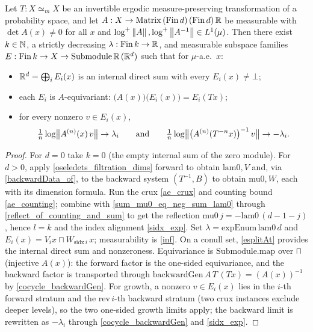 \begin{theorem}\label{oseledets_splitting}
  \leanok
  Let \(T : X \simeq_m X\) be an invertible ergodic measure-preserving transformation of a probability space, and let \(A : X \to \mathrm{Matrix}\,(\mathrm{Fin}\,d)\,(\mathrm{Fin}\,d)\,\mathbb{R}\) be measurable with \(\det A(x) \neq 0\) for all \(x\) and \(\log^+\left\lVert A \right\rVert, \log^+\left\lVert A^{-1} \right\rVert \in L^1(\mu)\). Then there exist \(k \in \mathbb{N}\), a strictly decreasing \(\lambda : \mathrm{Fin}\,k \to \mathbb{R}\), and measurable subspace families \(E : \mathrm{Fin}\,k \to X \to \mathrm{Submodule}\,\mathbb{R}\,(\mathbb{R}^d)\) such that for \(\mu\)-a.e.\ \(x\):
  \begin{itemize}
    \item \(\mathbb{R}^d = \bigoplus_{i} E_i(x)\) is an internal direct sum with every \(E_i(x) \neq \bot\);
    \item each \(E_i\) is \(A\)-equivariant: \(\bigl(A(x)\bigr)\bigl(E_i(x)\bigr) = E_i(Tx)\);
    \item for every nonzero \(v \in E_i(x)\),
    \[
      \tfrac{1}{n}\log\bigl\lVert A^{(n)}(x)\,v \bigr\rVert \to \lambda_i \qquad\text{and}\qquad \tfrac{1}{n}\log\bigl\lVert \bigl(A^{(n)}(T^{-n}x)\bigr)^{-1}\,v \bigr\rVert \to -\lambda_i.
    \]
  \end{itemize}
\end{theorem}
\begin{proof}\leanok
  For \(d = 0\) take \(k = 0\) (the empty internal sum of the zero module). For \(d > 0\), apply \cref{oseledets_filtration_dims} forward to obtain \(\mathrm{lam0}, V\) and, via \cref{backwardData_of}, to the backward system \((T^{-1}, B)\) to obtain \(\mathrm{mu0}, W\), each with its dimension formula. Run the crux \cref{ae_crux} and counting bound \cref{ae_counting}; combine with \cref{sum_mu0_eq_neg_sum_lam0} through \cref{reflect_of_counting_and_sum} to get the reflection \(\mathrm{mu0}\,j = -\mathrm{lam0}\,(d-1-j)\), hence \(l = k\) and the index alignment \cref{sidx_exp}. Set \(\lambda = \mathrm{expEnum}\,\mathrm{lam0}\,d\) and \(E_i(x) = V_i x \sqcap W_{\mathrm{sidx}\,i}\,x\); measurability is \cref{inf}. On a conull set, \cref{esplitAt} provides the internal direct sum and nonzeroness. Equivariance is \(\mathrm{Submodule.map}\) over \(\sqcap\) (injective \(A(x)\)): the forward factor is the one-sided equivariance, and the backward factor is transported through \(\mathrm{backwardGen}\,A\,T\,(Tx) = (A(x))^{-1}\) by \cref{cocycle_backwardGen}. For growth, a nonzero \(v \in E_i(x)\) lies in the \(i\)-th forward stratum and the \(\mathrm{rev}\,i\)-th backward stratum (two crux instances exclude deeper levels), so the two one-sided growth limits apply; the backward limit is rewritten as \(-\lambda_i\) through \cref{cocycle_backwardGen} and \cref{sidx_exp}.
\end{proof}
